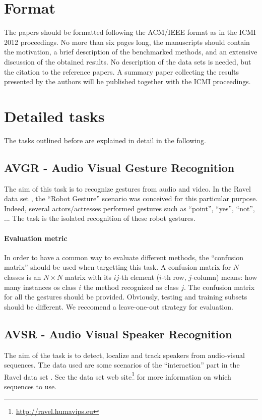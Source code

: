 \documentclass[a4paper]{article}
\begin{document}
\section*{Format}
The papers should be formatted following the ACM/IEEE format as in the ICMI 2012 proceedings. No more than six pages
long, the manuscripts should contain the motivation, a brief description of the benchmarked methods, and an extensive
discussion of the obtained results. No description of the data sets is needed, but the citation to the reference papers.
A summary paper collecting the results presented by the authors will be published together with the ICMI proceedings.

\section*{Detailed tasks}
The tasks outlined before are explained in detail in the following.

\subsection*{AVGR - Audio Visual Gesture Recognition}
The aim of this task is to recognize gestures from audio and video. In the Ravel data set \cite{Ravel}, the ``Robot
Gesture'' scenario was conceived for this particular purpose. Indeed, several actors/actresses performed gestures such
as ``point'', ``yes'', ``not'', ... The task is the isolated recognition of these robot gestures. 

\paragraph{Evaluation metric} In order to have a common way to evaluate different methods, the ``confusion matrix''
should be used when targetting this task. A confusion matrix for $N$ classes is an $N\times N$ matrix with its $ij$-th
element ($i$-th row, $j$-column) means: how many instances os class $i$ the method recognized as class $j$. The
confusion matrix for all the gestures should be provided. Obviously, testing and training subsets should be different.
We reccomend a leave-one-out strategy for evaluation.

\subsection*{AVSR - Audio Visual Speaker Recognition}
The aim of the task is to detect, localize and track speakers from audio-visual sequences. The data used are some
scenarios of the ``interaction'' part in the Ravel data set \cite{Ravel}. See the data set web
site\footnote{\url{http://ravel.humavips.eu}} for more information on which sequences to use.
\end{document}
